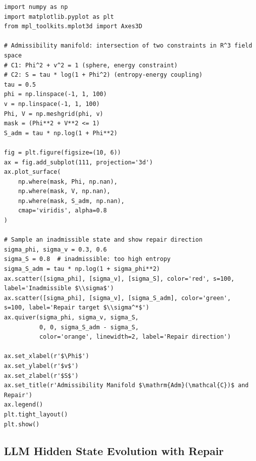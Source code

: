 \documentclass[a4paper,12pt]{article}
\theoremstyle{definition}
\newcommand{\Phi}{\Phi}
\begin{document}
\begin{lstlisting}
import numpy as np
import matplotlib.pyplot as plt
from mpl_toolkits.mplot3d import Axes3D

# Admissibility manifold: intersection of two constraints in R^3 field space
# C1: Phi^2 + v^2 = 1 (sphere, energy constraint)
# C2: S = tau * log(1 + Phi^2) (entropy-energy coupling)
tau = 0.5
phi = np.linspace(-1, 1, 100)
v = np.linspace(-1, 1, 100)
Phi, V = np.meshgrid(phi, v)
mask = (Phi**2 + V**2 <= 1)
S_adm = tau * np.log(1 + Phi**2)

fig = plt.figure(figsize=(10, 6))
ax = fig.add_subplot(111, projection='3d')
ax.plot_surface(
    np.where(mask, Phi, np.nan),
    np.where(mask, V, np.nan),
    np.where(mask, S_adm, np.nan),
    cmap='viridis', alpha=0.8
)

# Sample an inadmissible state and show repair direction
sigma_phi, sigma_v = 0.3, 0.6
sigma_S = 0.8  # inadmissible: too high entropy
sigma_S_adm = tau * np.log(1 + sigma_phi**2)
ax.scatter([sigma_phi], [sigma_v], [sigma_S], color='red', s=100, label='Inadmissible $\\sigma$')
ax.scatter([sigma_phi], [sigma_v], [sigma_S_adm], color='green', s=100, label='Repair target $\\sigma^*$')
ax.quiver(sigma_phi, sigma_v, sigma_S,
          0, 0, sigma_S_adm - sigma_S,
          color='orange', linewidth=2, label='Repair direction')

ax.set_xlabel(r'$\Phi$')
ax.set_ylabel(r'$v$')
ax.set_zlabel(r'$S$')
ax.set_title(r'Admissibility Manifold $\mathrm{Adm}(\mathcal{C})$ and Repair')
ax.legend()
plt.tight_layout()
plt.show()
\end{lstlisting}

\subsection{LLM Hidden State Evolution with Repair}
\end{document}

